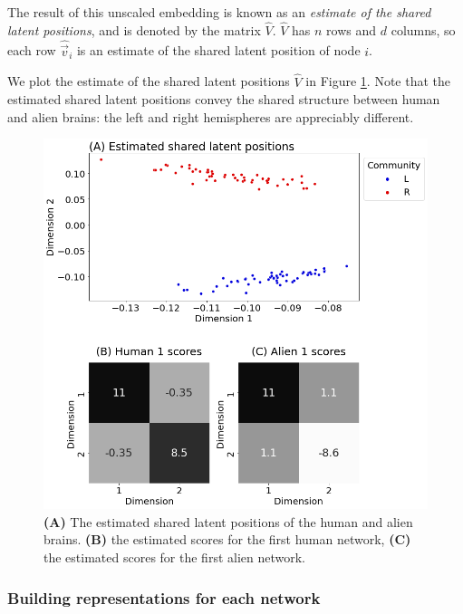 The result of this unscaled embedding is known as an \textit{estimate of the shared latent positions}, and is denoted by the matrix $\hat V$. $\hat V$ has $n$ rows and $d$ columns, so each row $\hat{\vec v}_i$ is an estimate of the shared latent position of node $i$. 

We plot the estimate of the shared latent positions $\hat V$ in Figure \ref{fig:ch6:multinet:mase:shared_lpm}. Note that the estimated shared latent positions convey the shared structure between human and alien brains: the left and right hemispheres are appreciably different. 

\begin{figure}[h]
    \centering
    \includegraphics[width=\linewidth]{representations/ch6/Images/mase_shared_lpm.png}
    \caption[parameter estimates from \texttt{mase}]{\textbf{(A)} The estimated shared latent positions of the human and alien brains. \textbf{(B)} the estimated scores for the first human network, \textbf{(C)} the estimated scores for the first alien network.}
    \label{fig:ch6:multinet:mase:shared_lpm}
\end{figure}

\subsubsection{Building representations for each network}

